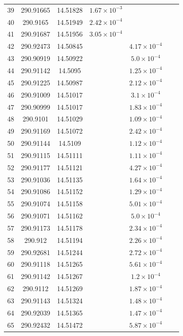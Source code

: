 \begin{table}
\begin{tabular}{ccccccc}
39 & 290.91665 & 14.51828 & $1.67\times10^{-3}$ &  &  &  \\
40 & 290.9165 & 14.51949 & $2.42\times10^{-4}$ &  &  &  \\
41 & 290.91687 & 14.51956 & $3.05\times10^{-4}$ &  &  &  \\
42 & 290.92473 & 14.50845 &  & $4.17\times10^{-4}$ &  &  \\
43 & 290.90919 & 14.50922 &  & $5.0\times10^{-4}$ &  &  \\
44 & 290.91142 & 14.5095 &  & $1.25\times10^{-4}$ &  &  \\
45 & 290.91225 & 14.50987 &  & $2.12\times10^{-4}$ &  &  \\
46 & 290.91009 & 14.51017 &  & $3.1\times10^{-4}$ &  &  \\
47 & 290.90999 & 14.51017 &  & $1.83\times10^{-4}$ &  &  \\
48 & 290.9101 & 14.51029 &  & $1.09\times10^{-4}$ &  &  \\
49 & 290.91169 & 14.51072 &  & $2.42\times10^{-4}$ &  &  \\
50 & 290.91144 & 14.5109 &  & $1.12\times10^{-4}$ &  &  \\
51 & 290.91115 & 14.51111 &  & $1.11\times10^{-4}$ &  &  \\
52 & 290.91177 & 14.51121 &  & $4.27\times10^{-4}$ &  &  \\
53 & 290.91036 & 14.51135 &  & $1.64\times10^{-4}$ &  &  \\
54 & 290.91086 & 14.51152 &  & $1.29\times10^{-4}$ &  &  \\
55 & 290.91074 & 14.51158 &  & $5.01\times10^{-4}$ &  &  \\
56 & 290.91071 & 14.51162 &  & $5.0\times10^{-4}$ &  &  \\
57 & 290.91173 & 14.51178 &  & $2.34\times10^{-4}$ &  &  \\
58 & 290.912 & 14.51194 &  & $2.26\times10^{-4}$ &  &  \\
59 & 290.92681 & 14.51244 &  & $2.72\times10^{-4}$ &  &  \\
60 & 290.91118 & 14.51265 &  & $5.61\times10^{-4}$ &  &  \\
61 & 290.91142 & 14.51267 &  & $1.2\times10^{-4}$ &  &  \\
62 & 290.9112 & 14.51269 &  & $1.87\times10^{-4}$ &  &  \\
63 & 290.91143 & 14.51324 &  & $1.48\times10^{-4}$ &  &  \\
64 & 290.92039 & 14.51365 &  & $1.47\times10^{-4}$ &  &  \\
65 & 290.92432 & 14.51472 &  & $5.87\times10^{-4}$ &  &  \\

\end{tabular}
\end{table}
